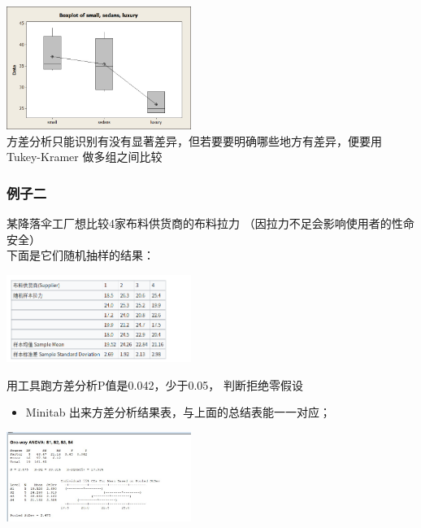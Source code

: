 
\includegraphics[width=6cm]{5anovaBoxplot_of_small_sedans_luxury.jpg}\\
方差分析只能识别有没有显著差异，但若要要明确哪些地方有差异，便要用
Tukey-Kramer 做多组之间比较

\hypertarget{ux65b9ux5deeux5206ux67902-anova-test}{%
\subsubsection{例子二}\label{ux65b9ux5deeux5206ux67902-anova-test}}

某降落伞工厂想比较4家布料供货商的布料拉力
（因拉力不足会影响使用者的性命安全）\\
下面是它们随机抽样的结果：


\includegraphics[width=6cm]{Screenshotfrom2022-12-2822-39-42.png}

用工具跑方差分析P值是0.042，少于0.05， 判断拒绝零假设

\begin{itemize}
\tightlist
\item
  Minitab 出来方差分析结果表，与上面的总结表能一一对应；
\end{itemize}


\includegraphics[width=6cm]{AnovaParachutes807Screenshot_2022-08-07_124737.jpg}

